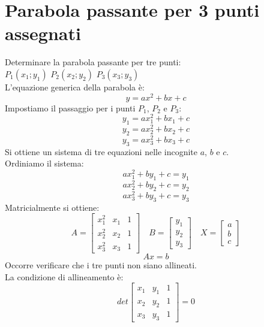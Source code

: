 \documentclass[12pt]{book}
\begin{document}
			\section{Parabola passante per 3 punti assegnati}
			Determinare la parabola passante per tre punti:\\ $P_1(x_1;y_1)$ $P_2(x_2;y_2)$ $P_3(x_3;y_3)$\\
			L'equazione generica della parabola è:
			\[y=ax^2+bx+c\]
			Impostiamo il passaggio per i punti $P_1$, $P_2$ e $P_3$:
			\[y_1=ax_1^2+bx_1+c\]
			\[y_2=ax_2^2+bx_2+c\]
			\[y_3=ax_3^2+bx_3+c\]
			Si ottiene un sistema di tre equazioni nelle incognite $a$, $b$ e $c$.\\ Ordiniamo il sistema:
			\[ax_1^2+by_1+c=y_1\]
			\[ax_2^2+by_2+c=y_2\]
			\[ax_3^2+by_3+c=y_3\]
			Matricialmente si ottiene:
			\[A=\begin{bmatrix}
				x_1^2 & x_1 & 1 \\
				x_2^2 & x_2 & 1 \\
				x_3^2 & x_3 & 1 
			\end{bmatrix}
			\quad
			B=\begin{bmatrix}
				y_1 \\
				y_2 \\
				y_3
			\end{bmatrix}
			\quad
			X=\begin{bmatrix}
				a\\
				b\\
				c
			\end{bmatrix}\]
			\[Ax=b\]
			Occorre verificare che i tre punti non siano allineati.\\
			La condizione di allineamento è:
			\[det\begin{bmatrix}
				x_1 & y_1 & 1\\
				x_2 & y_2 & 1\\
				x_3 & y_3 & 1
			\end{bmatrix}=0\]
			
\end{document}
